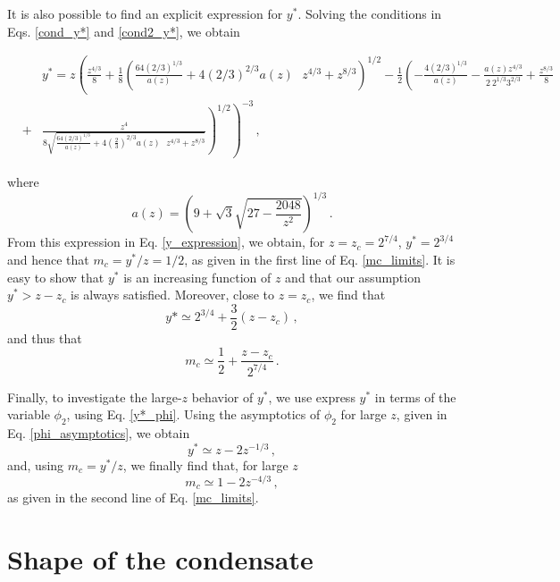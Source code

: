 \documentclass[aps,pre,twocolumn,superscriptaddress,showpacs]{revtex4-1}
\newcommand{\be}{\begin{equation}}
\newcommand{\ee}{\end{equation}}
\newcommand{\bea}{\begin{eqnarray}}
\newcommand{\eea}{\end{eqnarray}}
\begin{document}
It is also possible to find an explicit expression for $y^*$. Solving the conditions in Eqs. \eqref{cond_y*} and \eqref{cond2_y*}, we obtain
\begin{widetext}
\bea
&&y^*=z
\left(\frac{z^{4/3}}{8}+\frac{1}{8} \left(\frac{64 \left(2/3\right)^{1/3}}{a(z)}+4 \left(2/3\right)^{2/3} a(z)\text{  }z^{4/3}+z^{8/3}\right)^{1/2}-\right.
\frac{1}{2} \left(-\frac{4 \left(2/3\right)^{1/3}}{a(z)}-\frac{a(z) z^{4/3}}{2\ 2^{1/3} 3^{2/3}}+\frac{z^{8/3}}{8}\right.\nonumber\\&+ &
\left.\left.\frac{z^4}{8 \sqrt{\frac{64 \left(2/3\right)^{1/3}}{a(z)}+4 \left(\frac{2}{3}\right)^{2/3} a(z)\text{  }z^{4/3}+z^{8/3}}}\right)^{1/2}\right)^{-3}\,,
\label{y_expression}
\eea
\end{widetext}
where
\be
a(z)=\left(9+\sqrt{3}\sqrt{27-\frac{2048}{z^2}}\right)^{1/3}\,.
\ee
From this expression in Eq. \eqref{y_expression}, we obtain, for $z=z_c=2^{7/4}$, $y^*=2^{3/4}$ and hence that $m_c=y^*/z=1/2$, as given in the first line of Eq. \eqref{mc_limits}. It is easy to show that $y^*$ is an increasing function of $z$ and that our assumption $y^*>z-z_c$ is always satisfied. Moreover, close to $z=z_c$, we find that
\begin{equation}
y*\simeq 2^{3/4}+\frac32 (z-z_c)\,,
\end{equation} 
and thus that
\begin{equation}
m_c\simeq\frac12+\frac{z-z_c}{2^{7/4}}\,.
\end{equation}

Finally, to investigate the large-$z$ behavior of $y^*$, we use express $y^*$ in terms of the variable $\phi_2$, using Eq. \eqref{y*_phi}. Using the asymptotics of $\phi_2$ for large $z$, given in Eq. \eqref{phi_asymptotics}, we obtain
\begin{equation}
y^*\simeq z-2 z^{-1/3}\,,
\end{equation}
and, using $m_c=y^*/z$, we finally find that, for large $z$
\begin{equation}
m_c\simeq 1-2 z^{-4/3}\,,
\end{equation}
as given in the second line of Eq. \eqref{mc_limits}.


\section{Shape of the condensate}
\label{app:shape}
\end{document}
